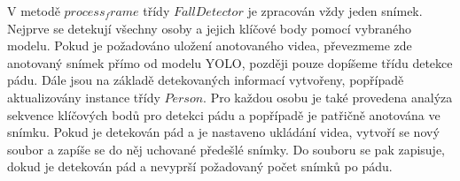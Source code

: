 V metodě $process_frame$ třídy $FallDetector$ je zpracován vždy jeden snímek.
Nejprve se detekují všechny osoby a jejich klíčové body pomocí vybraného
modelu. Pokud je požadováno uložení anotovaného videa, převezmeme zde anotovaný
snímek přímo od modelu YOLO, později pouze dopíšeme třídu detekce pádu. Dále
jsou na základě detekovaných informací vytvořeny, popřípadě aktualizovány
instance třídy $Person$. Pro každou osobu je také provedena analýza sekvence
klíčových bodů pro detekci pádu a popřípadě je patřičně anotována ve snímku.
Pokud je detekován pád a je nastaveno ukládání videa, vytvoří se nový soubor a
zapíše se do něj uchované předešlé snímky. Do souboru se pak zapisuje, dokud je  
detekován pád a nevyprší požadovaný počet snímků po pádu.

\endinput